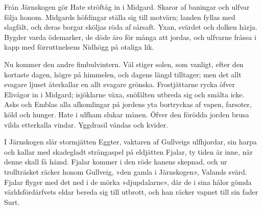 Från Järnskogen gör Hate ströftåg in i Midgard. Skaror af baningar och
ulfvar följa honom. Midgards höfdingar ställa sig till motvärn; landen
fyllas med slagfält, och deras borgar sköljas röda af sårsaft. Yxan,
svärdet och dolken härja. Bygder varda ödemarker, de döde äro för många
att jordas, och ulfvarne fråssa i kapp med förruttnelsens Nidhögg på
otaliga lik.

Nu kommer den andre fimbulvintern. Väl stiger solen, som vanligt, efter
den kortaste dagen, högre på himmelen, och dagens längd tilltager; men
det allt svagare ljuset återkallar en allt svagare grönska.
Frostjättarne rycka öfver Elivågor in i Midgard; isjöklarne växa,
snöfälten utbreda sig och smälta icke. Asks och Emblas alla afkomlingar
på jordens yta bortryckas af vapen, farsoter, köld och hunger. Hate i
ulfham slukar månen. Öfver den förödda jorden brusa vilda etterkalla
vindar. Yggdrasil våndas och kvider.

I Järnskogen slår stormjätten Eggter, vaktaren af Gullveigs ulfhjordar,
sin harpa och kallar med skadegladt strängaspel på eldjätten Fjalar, ty
tiden är inne, när denne skall få hämd. Fjalar kommer i den röde hanens
skepnad, och ur trollträsket räcker honom Gullveig, »den gamla i
Järnskogen», Valands svärd. Fjalar flyger med det ned i de mörka
»djupdalarne», där de i sina hålor gömda världsfördärfvets eldar bereda
sig till utbrott, och han räcker vapnet till sin fader Surt.

